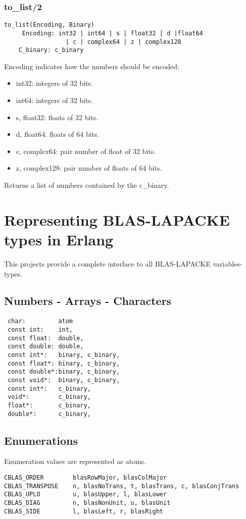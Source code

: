 \documentclass{article}
\begin{document}
    \subsubsection{to\_list/2}
        \begin{verbatim}
to_list(Encoding, Binary)
     Encoding: int32 | int64 | s | float32 | d |float64
                 | c | complex64 | z | complex128
    C_binary: c_binary
        \end{verbatim}
        Encoding indicates how the numbers should be encoded:
        \begin{itemize}
            \item int32: integers of 32 bits.
            \item int64: integers of 32 bits.
            \item s, float32: floats of 32 bits.
            \item d, float64: floats of 64 bits.
            \item c, complex64: pair number of float of 32 bits.
            \item z, complex128: pair number of floats of 64 bits.
        \end{itemize}
        Returns a list of numbers contained by the c\_binary.

\newpage
\section{Representing BLAS-LAPACKE types in Erlang}
This projects provide a complete interface to all BLAS-LAPACKE variables-types.

\subsection{Numbers - Arrays - Characters}
\begin{verbatim}
 char:         atom
 const int:    int,
 const float:  double,
 const double: double,
 const int*:   binary, c_binary,
 const float*: binary, c_binary,
 const double*:binary, c_binary,
 const void*:  binary, c_binary,
 const int*:   c_binary,
 void*:        c_binary,
 float*:       c_binary,
 double*:      c_binary,
\end{verbatim}

\subsection{Enumerations}
Enumeration values are represented as atoms.
\begin{verbatim}
CBLAS_ORDER        blasRowMajor, blasColMajor 
CBLAS_TRANSPOSE    n, blasNoTrans, t, blasTrans, c, blasConjTrans
CBLAS_UPLO         u, blasUpper, l, blasLower
CBLAS_DIAG         n, blasNonUnit, u, blasUnit
CBLAS_SIDE         l, blasLeft, r, blasRight
\end{verbatim}
\end{document}

